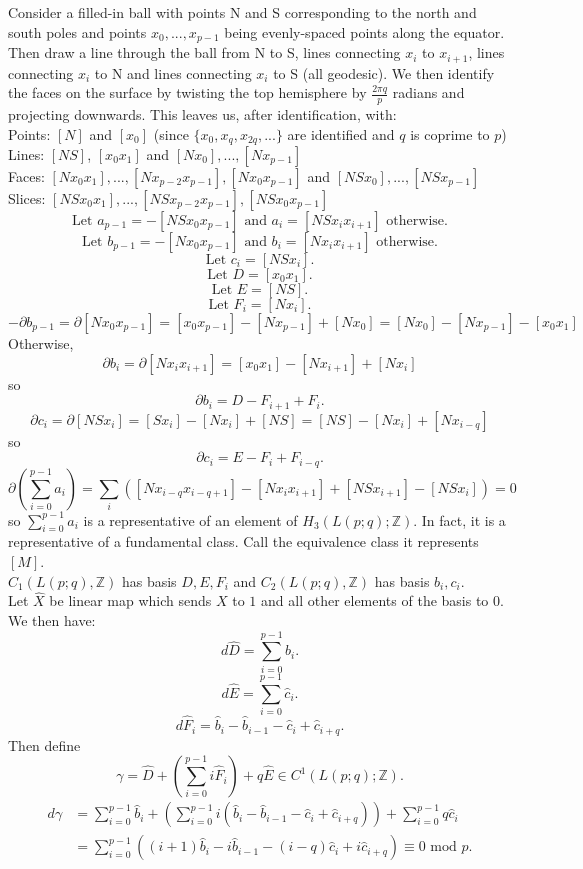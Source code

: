 \documentclass{article}
\begin{document}
\noindent Consider a filled-in ball with points N and S corresponding to the north and south poles and points $x_0,...,x_{p-1}$ being evenly-spaced points along the equator. Then draw a line through the ball from N to S, lines connecting $x_i$ to $x_{i+1}$, lines connecting $x_i$ to N and lines connecting $x_i$ to S (all geodesic). We then identify the faces on the surface by twisting the top hemisphere by $\frac{2\pi q}{p}$ radians and projecting downwards. This leaves us, after identification, with:\\
Points: $[N]$ and $[x_0]$ (since $\{x_0,x_q,x_{2q},...\}$ are identified and $q$ is coprime to $p$)\\
Lines: $[NS]$, $[x_0x_1]$ and $[Nx_0],...,[Nx_{p-1}]$\\
Faces: $[Nx_0x_1],...,[Nx_{p-2}x_{p-1}],[Nx_0x_{p-1}]$ and $[NSx_0],...,[NSx_{p-1}]$\\
Slices: $[NSx_0x_1],...,[NSx_{p-2}x_{p-1}],[NSx_0x_{p-1}]$\\
\[\text{Let }a_{p-1}=-[NSx_0x_{p-1}]\text{ and }a_i=[NSx_ix_{i+1}]\text{ otherwise.}\]
\[\text{Let }b_{p-1}=-[Nx_0x_{p-1}]\text{ and }b_i=[Nx_ix_{i+1}]\text{ otherwise.}\]
\[\text{Let }c_i=[NSx_i].\]
\[\text{Let }D=[x_0x_1].\]
\[\text{Let }E=[NS].\]
\[\text{Let }F_i=[Nx_i].\]
\[-\partial b_{p-1}=\partial[Nx_0x_{p-1}]=[x_0x_{p-1}]-[Nx_{p-1}]+[Nx_0]=[Nx_0]-[Nx_{p-1}]-[x_0x_1]\]
Otherwise, \[\partial b_i=\partial[Nx_ix_{i+1}]=[x_0x_1]-[Nx_{i+1}]+[Nx_i]\]
so \[\partial b_i=D-F_{i+1}+F_i.\]
\[\partial c_i=\partial[NSx_i]=[Sx_i]-[Nx_i]+[NS]=[NS]-[Nx_i]+[Nx_{i-q}]\]
so \[\partial c_i=E-F_i+F_{i-q}.\]
\[\partial(\sum_{i=0}^{p-1}a_i)=\sum_i([Nx_{i-q}x_{i-q+1}]-[Nx_ix_{i+1}]+[NSx_{i+1}]-[NSx_i])=0\] so $\sum_{i=0}^{p-1}a_i$ is a representative of an element of $H_3(L(p;q);\mathbb{Z})$. In fact, it is a representative of a fundamental class. Call the equivalence class it represents $[M]$.\\
$C_1(L(p;q),\mathbb{Z})$ has basis $D,E,F_i$ and $C_2(L(p;q),\mathbb{Z})$ has basis $b_i,c_i$.\\
Let $\hat X$ be linear map which sends $X$ to $1$ and all other elements of the basis to $0$. We then have:\\
\[d\hat D=\sum_{i=0}^{p-1}\hat b_i.\]
\[d\hat E=\sum_{i=0}^{p-1}\hat c_i.\]
\[d\hat F_i=\hat b_i-\hat b_{i-1}-\hat c_i+\hat c_{i+q}.\]
Then define \[\gamma=\hat D + (\sum_{i=0}^{p-1}i\hat F_i)+q\hat E\in C^1(L(p;q);\mathbb{Z}).\]
\begin{align*}
d\gamma&=\sum_{i=0}^{p-1}\hat b_i+(\sum_{i=0}^{p-1}i(\hat b_i-\hat b_{i-1}-\hat c_i+\hat c_{i+q}))+\sum_{i=0}^{p-1}q\hat c_i\\
&=\sum_{i=0}^{p-1}((i+1)\hat b_i-i\hat b_{i-1}-(i-q)\hat c_i+i\hat c_{i+q})\equiv 0\text{ mod }p.\\
\end{align*}
\end{document}
